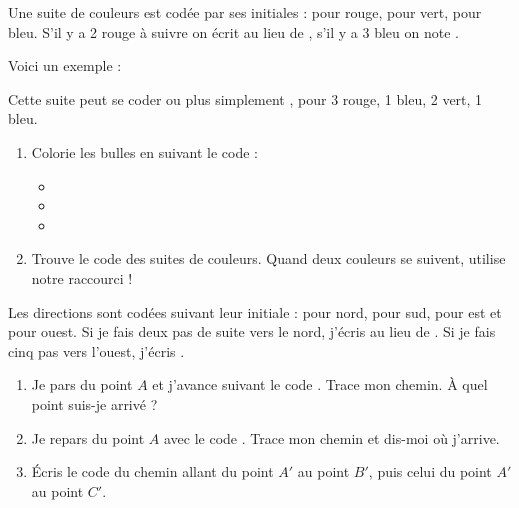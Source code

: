 \documentclass[class=report,crop=false, 12pt]{standalone}
\begin{document}

\begin{activite}
Une suite de couleurs est codée par ses initiales :  pour rouge,  pour vert,  pour bleu. 
S’il y a 2 rouge à suivre on écrit  au lieu de , s’il y a 3 bleu on note .

Voici un exemple :


Cette suite peut se coder  ou plus simplement , pour 3 rouge, 1 bleu, 2 vert, 1 bleu.

\begin{enumerate}
  \item  Colorie les bulles en suivant le code :
  \begin{itemize}
  \item {}

  
  \item {}
  

  \item {}

  
  \end{itemize}
  
  \item Trouve le code des suites de couleurs. Quand deux couleurs se suivent, utilise notre raccourci !

   
\end{enumerate}

\end{activite}


\begin{activite}
Les directions sont codées suivant leur initiale :  pour nord,  pour sud,  pour est et  pour ouest. Si je fais deux pas de suite vers le nord, j'écris  au lieu de . Si je fais cinq pas vers l’ouest, j'écris .
\begin{enumerate}
  \item  Je pars du point $A$ et j’avance suivant le code . Trace mon chemin. À quel point suis-je arrivé ?
  

  \item Je repars du point $A$ avec le code . Trace mon chemin et dis-moi où j’arrive.

 
   
  \item  Écris le code du chemin allant du point $A'$ au point $B'$, puis celui du point $A'$ au point $C'$.



\end{enumerate}
\end{activite}
\end{document}
